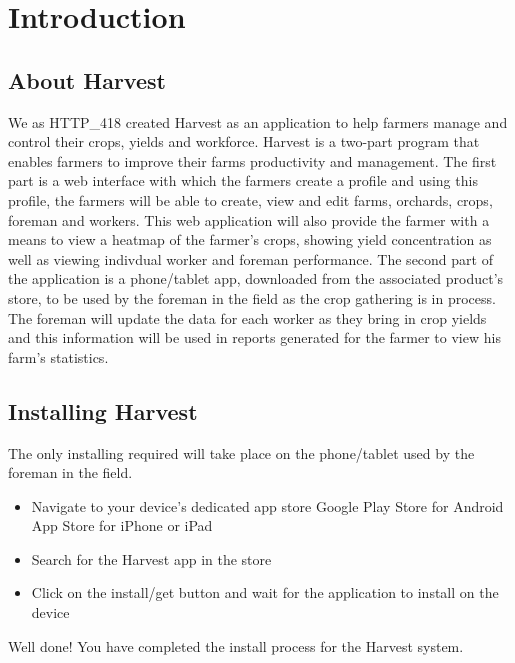 \documentclass[11pt,fleqn]{book} %
\begin{document}
\pagestyle{fancy} %



\chapter{Introduction}
	\section{About Harvest}
		We as HTTP\_418 created Harvest as an application to help farmers manage and control their crops, yields and workforce. Harvest is a two-part program that enables farmers to improve their farms productivity and management. The first part is a web interface with which the farmers create a profile and using this profile, the farmers will be able to create, view and edit farms, orchards, crops, foreman and workers. This web application will also provide the farmer with a means to view a heatmap of the farmer's crops, showing yield concentration as well as viewing indivdual worker and foreman performance. The second part of the application is a phone/tablet app, downloaded from the associated product's store, to be used by the foreman in the field as the crop gathering is in process. The foreman will update the data for each worker as they bring in crop yields and this information will be used in reports generated for the farmer to view his farm's statistics.
	\section{Installing Harvest}
		The only installing required will take place on the phone/tablet used by the foreman in the field.
		\begin{itemize}
			\item Navigate to your device's dedicated app store
				\subitem Google Play Store for Android
				\subitem App Store for iPhone or iPad
			\item Search for the Harvest app in the store
			\item Click on the install/get button and wait for the application to install on the device
		\end{itemize}
		Well done! You have completed the install process for the Harvest system.
\end{document}
